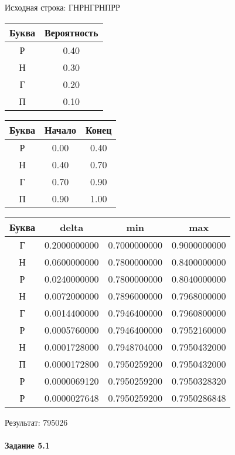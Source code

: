 \documentclass[a4paper, 12pt]{article}
\begin{document}
Исходная строка: ГНРНГРНПРР\
\begin{center}
 \begin{tabular}{ |c|c| } 
  \hline
     Буква & Вероятность \\ \hline
Р & 0.40\\\hline
Н & 0.30\\\hline
Г & 0.20\\\hline
П & 0.10
\\ \hline \end{tabular}
\end{center}
\begin{center}
 \begin{tabular}{ |c|c|c| } 
  \hline
     Буква & Начало & Конец \\ \hline
Р & 0.00 & 0.40\\\hline
Н & 0.40 & 0.70\\\hline
Г & 0.70 & 0.90\\\hline
П & 0.90 & 1.00
\\ \hline \end{tabular}
\end{center}
\begin{center}
 \begin{tabular}{ |c|c|c|c| } 
  \hline
     Буква & delta & min & max \\ \hline
Г & 0.2000000000 & 0.7000000000 & 0.9000000000\\\hline
Н & 0.0600000000 & 0.7800000000 & 0.8400000000\\\hline
Р & 0.0240000000 & 0.7800000000 & 0.8040000000\\\hline
Н & 0.0072000000 & 0.7896000000 & 0.7968000000\\\hline
Г & 0.0014400000 & 0.7946400000 & 0.7960800000\\\hline
Р & 0.0005760000 & 0.7946400000 & 0.7952160000\\\hline
Н & 0.0001728000 & 0.7948704000 & 0.7950432000\\\hline
П & 0.0000172800 & 0.7950259200 & 0.7950432000\\\hline
Р & 0.0000069120 & 0.7950259200 & 0.7950328320\\\hline
Р & 0.0000027648 & 0.7950259200 & 0.7950286848
\\ \hline \end{tabular}
\end{center}
Результат: 795026
\pagebreak
\paragraph{Задание 5.1}
\end{document}
